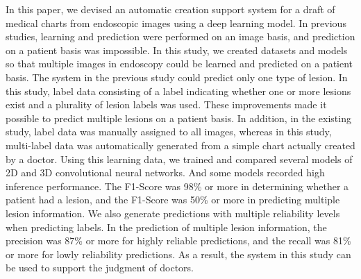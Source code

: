 In this paper, we devised an automatic creation support system for a draft of medical charts from endoscopic images using a deep learning model.
In previous studies, learning and prediction were performed on an image basis, and prediction on a patient basis was impossible.
In this study, we created datasets and models so that multiple images in endoscopy could be learned and predicted on a patient basis.
The system in the previous study could predict only one type of lesion.
In this study, label data consisting of a label indicating whether one or more lesions exist and a plurality of lesion labels was used.
These improvements made it possible to predict multiple lesions on a patient basis.
In addition, in the existing study, label data was manually assigned to all images, whereas in this study, multi-label data was automatically generated from a simple chart actually created by a doctor.
Using this learning data, we trained and compared several models of 2D and 3D convolutional neural networks. 
And some models recorded high inference performance.
The F1-Score was 98\% or more in determining whether a patient had a lesion, and the F1-Score was 50\% or more in predicting multiple lesion information.
We also generate predictions with multiple reliability levels when predicting labels.
In the prediction of multiple lesion information, the precision was 87\% or more for highly reliable predictions, and the recall was 81\% or more for lowly reliability predictions.
As a result, the system in this study can be used to support the judgment of doctors.
